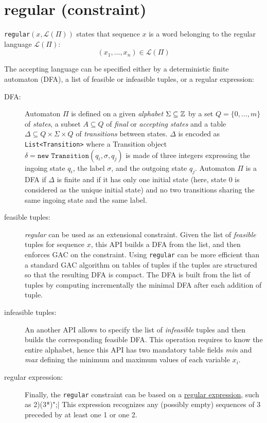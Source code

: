 \label{regular}
\hypertarget{regular}{}

\section{regular (constraint)}\label{regular:regularconstraint}\hypertarget{regular:regularconstraint}{}
\begin{notedef}
  \texttt{regular}$(x,\mathcal{L}(\Pi))$ states that sequence $x$ is a word belonging to the regular language $\mathcal{L}(\Pi)$:
$$(x_1,\ldots,x_n)\in\mathcal{L}(\Pi)$$
\end{notedef}

The accepting language can be specified either by a deterministic finite automaton (DFA), a list of feasible or infeasible tuples, or a regular expression:
\begin{description}
\item[DFA:] Automaton $\Pi$ is defined on a given \emph{alphabet} $\Sigma\subseteq\mathbb{Z}$ by a set $Q=\{0,\ldots,m\}$ of \emph{states}, a subset $A\subseteq Q$ of \emph{final} or \emph{accepting states} and a table $\Delta\subseteq Q\!\times\!\Sigma\!\times Q$ of \emph{transitions} between states. $\Delta$ is encoded as \texttt{List<Transition>} where a Transition object $\delta=\texttt{new Transition}(q_i,\sigma,q_j)$ is made of three integers expressing the ingoing state $q_i$, the label $\sigma$, and the outgoing state $q_j$.
Automaton $\Pi$ is a DFA if $\Delta$ is finite and if it has only one initial state (here, state $0$ is considered as the unique initial state) and no two transitions sharing the same ingoing state and the same label.
\item[feasible tuples:] \emph{regular} can be used as an extensional constraint. Given the list of \emph{feasible} tuples for sequence $x$, this API builds a DFA from the list, and then enforces GAC on the constraint. Using \texttt{regular} can be more efficient than a standard GAC algorithm on tables of tuples if the tuples are structured so that the resulting DFA is compact. The DFA is built from the list of tuples by computing incrementally the minimal DFA after each addition of tuple. 
\item[infeasible tuples:] An another API allows to specify the list of \emph{infeasible} tuples and then builds the corresponding feasible DFA. This operation requires to know the entire alphabet, hence this API has two mandatory table fields \emph{min} and \emph{max} defining the minimum and maximum values of each variable $x_i$.
\item[regular expression:] Finally, the \texttt{regular} constraint can be based on a \href{http://en.wikipedia.org/wiki/regularexpression}{regular expression}, such as 2)(3*)";| This expression recognizes any (possibly empty) sequences of 3 preceded by at least one 1 or one 2.
\end{description}

